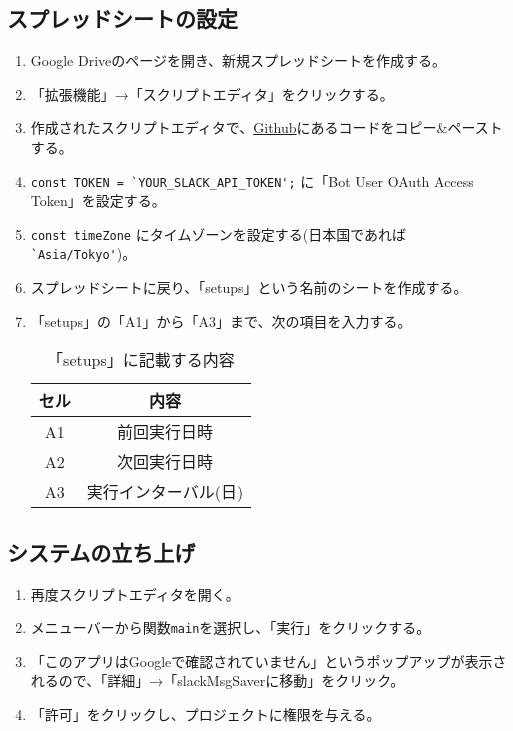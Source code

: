 \documentclass[a4j, 11pt, dvipdfmx]{jsarticle}
\begin{document}
\subsection{スプレッドシートの設定}
\begin{enumerate}
\item Google Driveのページを開き、新規スプレッドシートを作成する。
\item 「拡張機能」→「スクリプトエディタ」をクリックする。
\item 作成されたスクリプトエディタで、\href{https://github.com/RjChiba/slackMsgSaver/blob/main/main.js}{Github}にあるコードをコピー\&ペーストする。
\item \verb|const TOKEN = `YOUR_SLACK_API_TOKEN';| に「Bot User OAuth Access Token」を設定する。
\item \verb|const timeZone| にタイムゾーンを設定する(日本国であれば\verb|`Asia/Tokyo'|)。
\item スプレッドシートに戻り、「setups」という名前のシートを作成する。
\item 「setups」の「A1」から「A3」まで、次の項目を入力する。

\begin{table}[htp]
\caption{「setups」に記載する内容}
\begin{center}
\begin{tabular}{|c|c|}
\hline
セル & 内容\\
\hline
A1 & 前回実行日時\\
A2 & 次回実行日時\\
A3 & 実行インターバル(日)\\
\hline
\end{tabular}
\end{center}
\end{table}%
\end{enumerate}

\subsection{システムの立ち上げ}
\begin{enumerate}
\item 再度スクリプトエディタを開く。
\item メニューバーから関数\verb|main|を選択し、「実行」をクリックする。
\item 「このアプリはGoogleで確認されていません」というポップアップが表示されるので、「詳細」→「slackMsgSaverに移動」をクリック。
\item 「許可」をクリックし、プロジェクトに権限を与える。
\end{enumerate}
\end{document}
